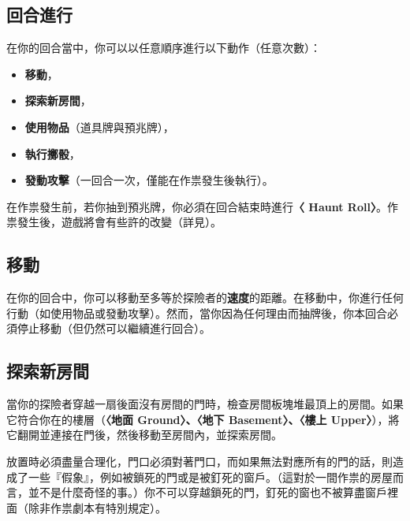 
\subsection{回合進行} \label{ssec:on-your-turn}

在你的回合當中，你可以以任意順序進行以下動作（任意次數）：
\begin{itemize}
	\item \textbf{移動}，
	\item \textbf{探索新房間}，
	\item \textbf{使用物品}（道具牌與預兆牌），
	\item \textbf{執行擲骰}，
	\item \textbf{發動攻擊}（一回合一次，僅能在作祟發生後執行）。
\end{itemize}
在作祟發生前，若你抽到預兆牌，你必須在回合結束時進行\textbf{〈 Haunt Roll〉}。作祟發生後，遊戲將會有些許的改變（詳見）。


\subsection{移動} \label{ssec:move}

在你的回合中，你可以移動至多等於探險者的\textbf{速度}的距離。在移動中，你進行任何行動（如使用物品或發動攻擊）。然而，當你因為任何理由而抽牌後，你本回合必須停止移動（但仍然可以繼續進行回合）。


\subsection{探索新房間} \label{ssec:discover-a-new-room}

當你的探險者穿越一扇後面沒有房間的門時，檢查房間板塊堆最頂上的房間。如果它符合你在的樓層（\textbf{〈地面 Ground〉、〈地下 Basement〉、〈樓上 Upper〉}），將它翻開並連接在門後，然後移動至房間內，並探索房間。

放置時必須盡量合理化，門口必須對著門口，而如果無法對應所有的門的話，則造成了一些『假象』，例如被鎖死的門或是被釘死的窗戶。（這對於一間作祟的房屋而言，並不是什麼奇怪的事。）你不可以穿越鎖死的門，釘死的窗也不被算盡窗戶裡面（除非作祟劇本有特別規定）。

